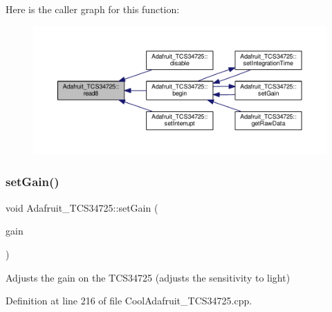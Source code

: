 Here is the caller graph for this function\+:
\nopagebreak
\begin{figure}[H]
\begin{center}
\leavevmode
\includegraphics[width=350pt]{class_adafruit___t_c_s34725_a3ffafbdd475d6baf9abda8dd067b5319_icgraph}
\end{center}
\end{figure}
\mbox{\label{class_adafruit___t_c_s34725_a6be06315a9d33f76e44550f574f023a5}} 
\subsubsection{\texorpdfstring{set\+Gain()}{setGain()}}
{\footnotesize\ttfamily void Adafruit\+\_\+\+T\+C\+S34725\+::set\+Gain (\begin{DoxyParamCaption}\item[{\hyperlink{_cool_adafruit___t_c_s34725_8h_a23611ba111ac38012551332ee7189f9a}{tcs34725\+Gain\+\_\+t}}]{gain }\end{DoxyParamCaption})}

Adjusts the gain on the T\+C\+S34725 (adjusts the sensitivity to light) 

Definition at line 216 of file Cool\+Adafruit\+\_\+\+T\+C\+S34725.\+cpp.


